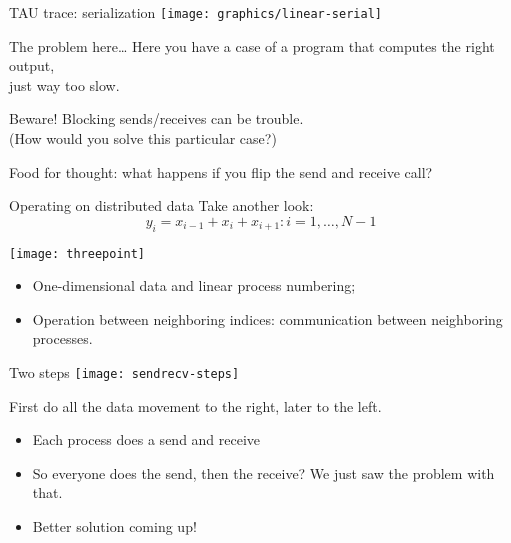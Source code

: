 \begin{exerciseframe}
  
\end{exerciseframe}

\begin{numberedframe}{TAU trace: serialization}
  \texttt{[image: graphics/linear-serial]}
  \label{fig:serialization}
\end{numberedframe}

\begin{numberedframe}{The problem here\ldots}
  Here you have a case of a program that computes the right output,\\
  just way too slow.

  Beware! Blocking sends/receives can be trouble. \\
  (How would you solve this particular case?)

  Food for thought: what happens if you flip the send and receive call?
\end{numberedframe}

\begin{optexerciseframe}
  
\end{optexerciseframe}


\begin{numberedframe}{Operating on distributed data}
Take another look: \[ y_i=x_{i-1}+x_i+x_{i+1}\colon i=1,\ldots,N-1 \]

\texttt{[image: threepoint]}

\begin{itemize}
\item One-dimensional data and linear process numbering;
\item Operation between neighboring indices: communication between
  neighboring processes.
\end{itemize}
\end{numberedframe}

\begin{numberedframe}{Two steps}
  \texttt{[image: sendrecv-steps]}

  First do all the data movement to the right, later to the left.
  \begin{itemize}
  \item Each process does a send and receive
  \item So everyone does the send, then the receive? We just saw the
    problem with that.
  \item Better solution coming up!
  \end{itemize}
\end{numberedframe}

